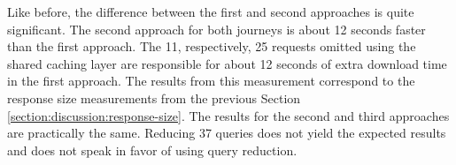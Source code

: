 \noindent Like before, the difference between the first and second approaches is quite significant. The second approach for both journeys is about 12 seconds faster than the first approach. The 11, respectively, 25 requests omitted using the shared caching layer are responsible for about 12 seconds of extra download time in the first approach. The results from this measurement correspond to the response size measurements from the previous Section \ref{section:discussion:response-size}. The results for the second and third approaches are practically the same. Reducing 37 queries does not yield the expected results and does not speak in favor of using query reduction.